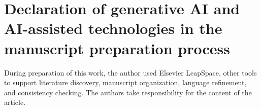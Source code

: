 \documentclass[preprint,12pt,authoryear]{elsarticle}
\begin{document}
\section*{Declaration of generative AI and AI-assisted technologies in the manuscript preparation process}
During preparation of this work, the author used Elsevier LeapSpace, other tools to support literature discovery, manuscript organization, language refinement, and consistency checking. The authors take responsibility for the content of the article.


\begingroup\raggedright
\setlength{\bibsep}{2pt}

\endgroup
\end{document}

